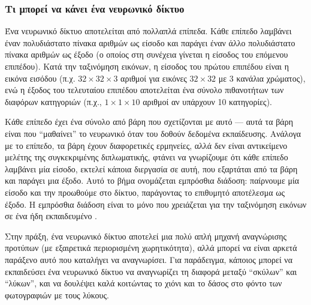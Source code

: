 \subsubsection{Τι μπορεί να κάνει ένα νευρωνικό δίκτυο}

Ένα νευρωνικό δίκτυο αποτελείται από πολλαπλά επίπεδα.  Κάθε επίπεδο λαμβάνει έναν πολυδιάστατο πίνακα αριθμών ως είσοδο και παράγει έναν άλλο πολυδιάστατο πίνακα αριθμών ως έξοδο (ο οποίος στη συνέχεια γίνεται η είσοδος του επόμενου επιπέδου). Κατά την ταξινόμηση εικόνων, η είσοδος του πρώτου επιπέδου είναι η εικόνα εισόδου  (π.χ. $32\times32\times3$ αριθμοί για εικόνες $32\times32$  με 3 κανάλια χρώματος), ενώ η έξοδος του τελευταίου επιπέδου αποτελείται  ένα σύνολο πιθανοτήτων των διαφόρων κατηγοριών (π.χ., $1\times1\times10$ αριθμοί αν υπάρχουν 10 κατηγορίες).
 
Κάθε επίπεδο έχει ένα σύνολο από βάρη που σχετίζονται με αυτό — αυτά τα βάρη είναι που “μαθαίνει” το νευρωνικό όταν του δοθούν δεδομένα εκπαίδευσης. Ανάλογα με το επίπεδο, τα βάρη έχουν διαφορετικές ερμηνείες, αλλά δεν είναι αντικείμενο μελέτης της συγκεκριμένης διπλωματικής, φτάνει να γνωρίζουμε ότι κάθε επίπεδο λαμβάνει μία είσοδο, εκτελεί κάποια διεργασία σε αυτή, που εξαρτάται από τα βάρη και παράγει μια έξοδο. Αυτό το βήμα ονομάζεται εμπρόσθια διάδοση: παίρνουμε μία είσοδο και την προωθούμε στο δίκτυο, παράγοντας το επιθυμητό αποτέλεσμα ως έξοδο. Η εμπρόσθια διάδοση είναι το μόνο που χρειάζεται για την ταξινόμηση εικόνων σε ένα ήδη εκπαιδευμένο .
 
Στην πράξη, ένα νευρωνικό δίκτυο αποτελεί μια πολύ απλή μηχανή αναγνώρισης προτύπων (με εξαιρετικά περιορισμένη χωρητικότητα), αλλά μπορεί να είναι αρκετά παράξενο αυτό που καταλήγει να αναγνωρίσει. Για παράδειγμα, κάποιος μπορεί να εκπαιδεύσει ένα νευρωνικό δίκτυο να αναγνωρίζει τη διαφορά μεταξύ “σκύλων” και “λύκων”, και να δουλέψει καλά κοιτώντας το χιόνι και το δάσος στο φόντο των φωτογραφιών με τους λύκους.
